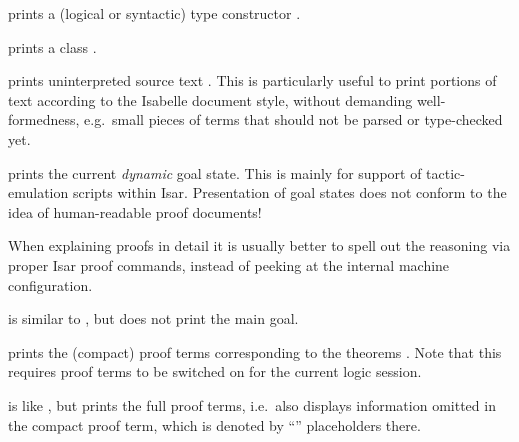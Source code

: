 \begin{isabellebody}
\begin{isamarkuptext}
\begin{description}
  \item {} prints a (logical or syntactic) type
    constructor \isa{{\isachardoublequote}{\isasymkappa}{\isachardoublequote}}.

  \item {} prints a class .

  \item {} prints uninterpreted source text .  This is particularly useful to print portions of text according
  to the Isabelle document style, without demanding well-formedness,
  e.g.\ small pieces of terms that should not be parsed or
  type-checked yet.

  \item {} prints the current \emph{dynamic} goal
  state.  This is mainly for support of tactic-emulation scripts
  within Isar.  Presentation of goal states does not conform to the
  idea of human-readable proof documents!

  When explaining proofs in detail it is usually better to spell out
  the reasoning via proper Isar proof commands, instead of peeking at
  the internal machine configuration.
  
  \item {} is similar to , but
  does not print the main goal.
  
  \item {} prints the (compact) proof terms
  corresponding to the theorems . Note that this
  requires proof terms to be switched on for the current logic
  session.
  
  \item {} is like , but prints the full proof terms, i.e.\ also displays
  information omitted in the compact proof term, which is denoted by
  ``\isa{{\isacharunderscore}}'' placeholders there.
  

\end{description}
\end{isamarkuptext}
\end{isabellebody}
